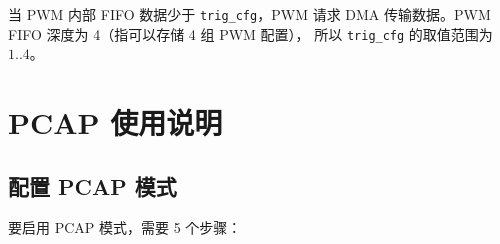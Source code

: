 \documentclass[
  12pt,
]{book}
\begin{document}
当 PWM 内部 FIFO 数据少于 \texttt{trig\_cfg}，PWM 请求 DMA 传输数据。PWM FIFO 深度为 4（指可以存储 4 组 PWM 配置），
所以 \texttt{trig\_cfg} 的取值范围为 \(1..4\)。

\hypertarget{pcap-ux4f7fux7528ux8bf4ux660e}{%
\section{PCAP 使用说明}\label{pcap-ux4f7fux7528ux8bf4ux660e}}

\hypertarget{ux914dux7f6e-pcap-ux6a21ux5f0f}{%
\subsection{配置 PCAP 模式}\label{ux914dux7f6e-pcap-ux6a21ux5f0f}}

要启用 PCAP 模式，需要 5 个步骤：
\end{document}
